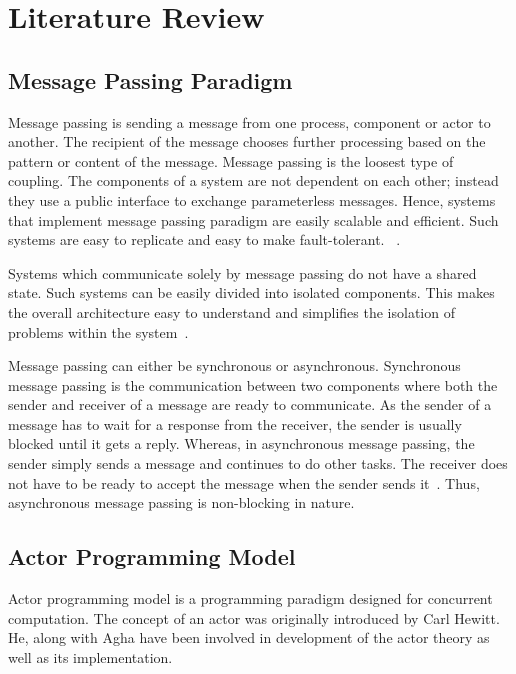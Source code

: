 \chapter{Literature Review}\label{chapter:literature_review}

\section{Message Passing Paradigm}
\label{sec:messagePassing}
  Message passing is sending a message from one process, component or actor to another. The recipient of the message chooses further processing based on the pattern or content of the message.
  Message passing is the loosest type of coupling. The components of a system are not dependent on each other; instead they use a public interface to exchange parameterless messages\cite{joecelko}. Hence, systems that implement message passing paradigm are easily scalable and efficient. Such systems are easy to replicate and easy to make fault-tolerant.
~\cite{Armstrong:2010:ERL:1810891.1810910}.

  Systems which communicate solely by message passing do not have a shared state. Such systems can be easily divided into isolated components. This makes the overall architecture easy to understand and simplifies the isolation of problems within the system~\cite{Armstrong:2010:ERL:1810891.1810910}.

  Message passing can either be synchronous or asynchronous. Synchronous message passing is the communication between two components where both the sender and receiver of a message are ready to communicate. As the sender of a message has to wait for a response from the receiver, the sender is usually blocked until it gets a reply. Whereas, in asynchronous message passing, the sender simply sends a message and continues to do other tasks. The receiver does not have to be ready to accept the message when the sender sends it~\cite{agha}. Thus, asynchronous message passing is non-blocking in nature.

\section{Actor Programming Model}
\label{sec:actorProgramming}
  Actor programming model is a programming paradigm designed for concurrent computation. The concept of an actor was originally introduced by Carl Hewitt\cite{hewitt}. He, along with Agha\cite{agha} have been involved in development of the actor theory as well as its implementation.

